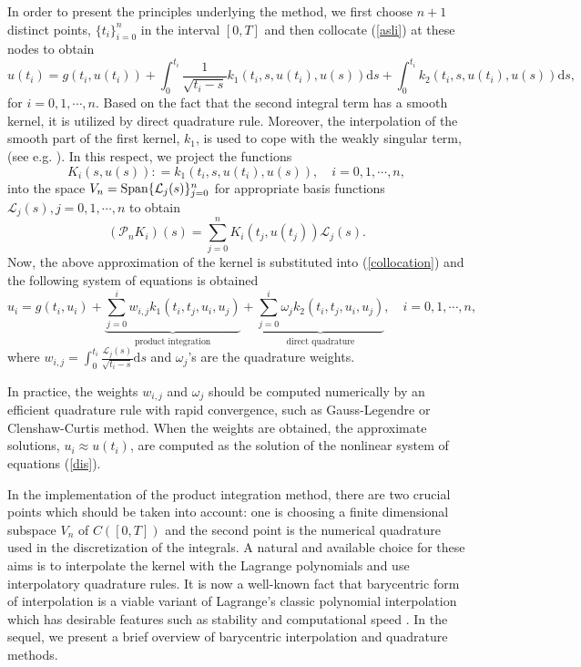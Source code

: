 \documentclass[fleqn,final,3p,11pt]{elsarticle}
\theoremstyle{definition}
\theoremstyle{remark}
\numberwithin{equation}{section}
\begin{document}
In order to present the principles underlying the method, we first choose $n+1$ distinct points, $\{ t_{i}\}_{i=0}^{n}$ in the interval $[0, T]$ and then collocate (\ref{asli}) at these nodes to obtain
\begin{equation}\label{collocation}
{u}(t_{i}) = g(t_{i}, {u}(t_{i})) + \int_{0}^{t_{i}}\frac{1}{\sqrt{t_{i}-s}}k_{1}(t_{i}, s, {u}(t_{i}), {u}(s))\mathrm{d}s+\int_{0}^{t_{i}}k_{2}(t_{i},s ,{u}(t_{i}),{u}(s))\mathrm{d}s,
\end{equation}
for $i=0,1,\cdots, n$. Based on the fact that the second integral term has a smooth kernel, it is utilized by direct quadrature rule. Moreover,
the interpolation of the smooth part of the  first kernel, $k_{1}$, is used to cope with the weakly singular term, (see e.g. \cite{orsi, hack, orsi1996product}).
In this respect, we project the functions \[K_{i}(s, {u}(s)) : = k_{1}(t_{i}, s, {u}(t_{i}), {u}(s)), \quad i=0,1, \cdots, n, \] into the space $V_{n}= \textmd{Span}\{\mathcal{L}_{j}(s)\}_{j=0}^{n}$
for appropriate basis functions $\mathcal{L}_{j}(s), j=0,1,\cdots,n$ to obtain
 \begin{equation*}
(\mathcal{P}_{n}K_{i})(s) = \sum_{j=0}^{n}K_{i}(t_{j}, {u}(t_{j}))\mathcal{L}_{j}(s).
\end{equation*}
Now, the above approximation of the kernel is substituted into (\ref{collocation}) and the following system of equations is obtained
\begin{equation}\label{dis}
u_{i} =  g(t_{i}, u_{i}) + \underbrace{\sum_{j=0}^{i} w_{i,j} k_{1}(t_{i}, t_{j}, {u}_{i}, {u}_{j})}_{\text{product integration}}+ \underbrace{\sum_{j=0}^{i} \omega_{j} k_{2}(t_{i}, t_{j}, {u}_{i}, {u}_{j})}_{\text{direct quadrature}}, \quad  i=0, 1, \cdots, n,
\end{equation}
where $w_{i, j} = \int_{0}^{t_{i}} \frac{\mathcal{L}_{j}(s)}{\sqrt{t_{i}-s}}\mathrm{d}s$ and $\omega_{j}$'s are the quadrature weights.

In practice, the weights $w_{i, j}$ and $\omega_{j}$ should be computed numerically by an efficient quadrature rule with rapid convergence, such as Gauss-Legendre or Clenshaw-Curtis method.
When the weights are obtained, the approximate solutions, $u_{i} \approx {u}(t_{i})$, are computed as the solution of the nonlinear system of equations (\ref{dis}).

In the implementation of the product integration method, there are two crucial points which should be taken into account: one is choosing a finite dimensional subspace  $V_{n}$ of $C([0,T])$ and the second point is the numerical quadrature used in the discretization of the integrals. A natural and available choice for these aims is to interpolate the kernel with the Lagrange polynomials and use interpolatory quadrature rules. It is now a well-known fact that barycentric form of interpolation is a viable variant of Lagrange's classic polynomial interpolation which has desirable features such as stability and computational speed \cite{kleinthesis, bary}. In the sequel, we present a brief overview of barycentric interpolation and quadrature methods.
\end{document}
